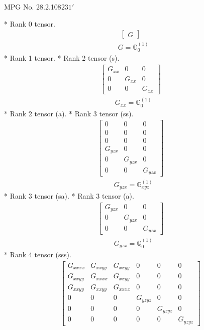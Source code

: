 \documentclass[fleqn,8pt,landscape]{jsarticle}
\begin{document}
\setcounter{MaxMatrixCols}{32}

\renewcommand{\tablename}{Table~}
\renewcommand{\figurename}{Figure~}
\begin{center}
\LARGE
MPG No. 28.2.108\quad$231'$
\end{center}
* Rank 0 tensor.
\begin{align*}
\begin{bmatrix} G \end{bmatrix}
\end{align*}
\begin{align*}
& G = \mathbb{G}_{0}^{(1)}
\end{align*}
* Rank 1 tensor.
* Rank 2 tensor (s).
\begin{align*}
\begin{bmatrix} G_{xx} & 0 & 0 \\ 0 & G_{xx} & 0 \\ 0 & 0 & G_{xx} \end{bmatrix}
\end{align*}
\begin{align*}
& G_{xx} = \mathbb{G}_{0}^{(1)}
\end{align*}
* Rank 2 tensor (a).
* Rank 3 tensor (ss).
\begin{align*}
\begin{bmatrix} 0 & 0 & 0 \\ 0 & 0 & 0 \\ 0 & 0 & 0 \\ G_{yzx} & 0 & 0 \\ 0 & G_{yzx} & 0 \\ 0 & 0 & G_{yzx} \end{bmatrix}
\end{align*}
\begin{align*}
& G_{yzx} = \mathbb{G}_{xyz}^{(1)}
\end{align*}
* Rank 3 tensor (sa).
* Rank 3 tensor (a).
\begin{align*}
\begin{bmatrix} G_{yzx} & 0 & 0 \\ 0 & G_{yzx} & 0 \\ 0 & 0 & G_{yzx} \end{bmatrix}
\end{align*}
\begin{align*}
& G_{yzx} = \mathbb{Q}_{0}^{(1)}
\end{align*}
* Rank 4 tensor (sss).
\begin{align*}
\begin{bmatrix} G_{xxxx} & G_{xxyy} & G_{xxyy} & 0 & 0 & 0 \\ G_{xxyy} & G_{xxxx} & G_{xxyy} & 0 & 0 & 0 \\ G_{xxyy} & G_{xxyy} & G_{xxxx} & 0 & 0 & 0 \\ 0 & 0 & 0 & G_{yzyz} & 0 & 0 \\ 0 & 0 & 0 & 0 & G_{yzyz} & 0 \\ 0 & 0 & 0 & 0 & 0 & G_{yzyz} \end{bmatrix}
\end{align*}
\end{document}
